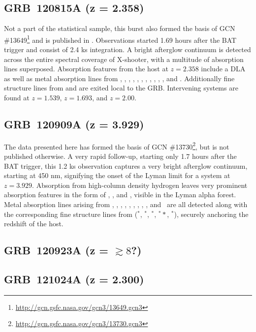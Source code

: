 \documentclass{aa}    %
\begin{document}
\subsection{GRB~120815A (z = 2.358)} 
Not a part of the statistical sample, this burst also formed the basis of  GCN
\#13649\footnote{\url{http://gcn.gsfc.nasa.gov/gcn3/13649.gcn3}} and is
published in \citet{Kruhler2013}. Observations started 1.69 hours after the BAT
trigger and consist of 2.4 ks integration. A bright afterglow continuum is
detected across the entire spectral coverage of X-shooter, with a multitude of
absorption lines superposed. Absorption features from the host at $z = 2.358$
include a DLA as well as metal absorption lines from \nv, \sii, \SIii, \oi,
\civ, \SIiv, \feii, \alii, \aliii, \mnii, \mgii, and \mgi. Additionally
fine structure lines from \NIii and \feii are exited local to the GRB.
Intervening systems are found at $z = 1.539$, $z = 1.693$, and $z = 2.00$.


\subsection{GRB~120909A (z = 3.929)}
The data presented here has formed the basis of GCN \#13730\footnote{\url{http://gcn.gsfc.nasa.gov/gcn3/13730.gcn3}}, but is not
published otherwise. A very rapid follow-up, starting only 1.7 hours after the
BAT trigger, this 1.2 ks observation captures a very bright afterglow
continuum, starting at 450 nm, signifying the onset of the Lyman limit for a 
system at $z = 3.929$. Absorption from high-column density hydrogen leaves very
prominent absorption features in the form of \lya, \lyb, and \lyg, visible in
the Lyman alpha forest. Metal absorption lines arising from \feii, \NIii,
\SIii, \sii, \alii, \aliii, \cii, \oi, \civ, and \znii~are all detected along
with the corresponding fine structure lines from (\feii$^*$, \SIii$^*$,
\oi$^*$, \oi$^**$, \cii$^*$), securely anchoring the redshift of the host.




\subsection{GRB~120923A (z = $\gtrsim8$?)}






\subsection{GRB~121024A (z = 2.300)}
\end{document}
